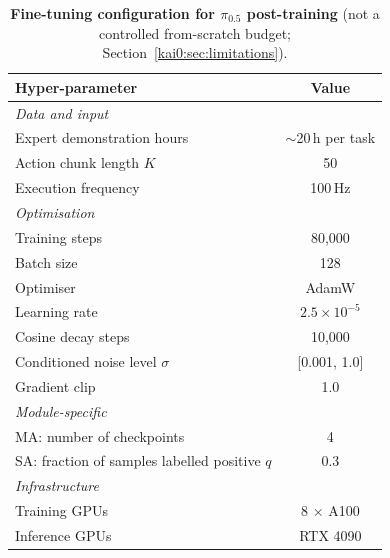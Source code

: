 \begin{table}[tb]
  \centering
  \caption[Fine-tuning configuration for $\pi_{0.5}$ post-training]{\textbf{Fine-tuning configuration for $\pi_{0.5}$ post-training} (not a controlled from-scratch budget; Section~\ref{kai0:sec:limitations}).}
  \label{kai0:tab:hyperparams}
  \begin{tabular}{lc}
    \toprule
    \textbf{Hyper-parameter} & \textbf{Value} \\
    \midrule
    \multicolumn{2}{l}{\textit{Data and input}} \\
    Expert demonstration hours & $\sim$20\,h per task \\
    Action chunk length $K$ & 50 \\
    Execution frequency & 100\,Hz \\
    \midrule
    \multicolumn{2}{l}{\textit{Optimisation}} \\
    Training steps & 80{,}000 \\
    Batch size & 128 \\
    Optimiser & AdamW \\
    Learning rate & $2.5 \times 10^{-5}$ \\
    Cosine decay steps & 10{,}000 \\
    Conditioned noise level $\sigma$ & [0.001, 1.0] \\
    Gradient clip & 1.0 \\
    \midrule
    \multicolumn{2}{l}{\textit{Module-specific}} \\
    MA: number of checkpoints & 4 \\
    SA: fraction of samples labelled positive $q$ & 0.3 \\
    \midrule
    \multicolumn{2}{l}{\textit{Infrastructure}} \\
    Training GPUs & 8 $\times$ A100 \\
    Inference GPUs & RTX 4090 \\
    \bottomrule
  \end{tabular}
\end{table}

